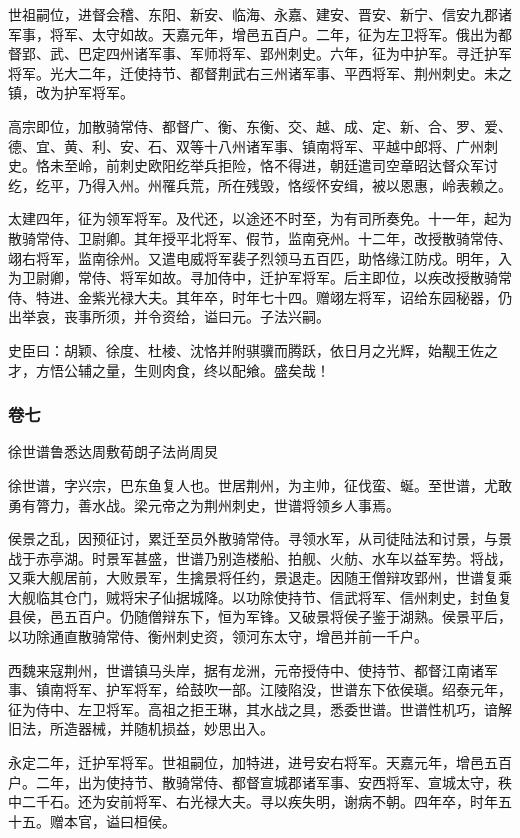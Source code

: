 \documentclass[]{article}
\begin{document}
世祖嗣位，进督会稽、东阳、新安、临海、永嘉、建安、晋安、新宁、信安九郡诸军事，将军、太守如故。天嘉元年，增邑五百户。二年，征为左卫将军。俄出为都督郢、武、巴定四州诸军事、军师将军、郢州刺史。六年，征为中护军。寻迁护军将军。光大二年，迁使持节、都督荆武右三州诸军事、平西将军、荆州刺史。未之镇，改为护军将军。

高宗即位，加散骑常侍、都督广、衡、东衡、交、越、成、定、新、合、罗、爱、德、宜、黄、利、安、石、双等十八州诸军事、镇南将军、平越中郎将、广州刺史。恪未至岭，前刺史欧阳纥举兵拒险，恪不得进，朝廷遣司空章昭达督众军讨纥，纥平，乃得入州。州罹兵荒，所在残毁，恪绥怀安缉，被以恩惠，岭表赖之。

太建四年，征为领军将军。及代还，以途还不时至，为有司所奏免。十一年，起为散骑常侍、卫尉卿。其年授平北将军、假节，监南兗州。十二年，改授散骑常侍、翊右将军，监南徐州。又遣电威将军裴子烈领马五百匹，助恪缘江防戍。明年，入为卫尉卿，常侍、将军如故。寻加侍中，迁护军将军。后主即位，以疾改授散骑常侍、特进、金紫光禄大夫。其年卒，时年七十四。赠翊左将军，诏给东园秘器，仍出举哀，丧事所须，并令资给，谥曰元。子法兴嗣。

史臣曰：胡颖、徐度、杜棱、沈恪并附骐骥而腾跃，依日月之光辉，始觏王佐之才，方悟公辅之量，生则肉食，终以配飨。盛矣哉！

\hypertarget{header-n4450}{%
\subsubsection{卷七}\label{header-n4450}}

徐世谱鲁悉达周敷荀朗子法尚周炅

徐世谱，字兴宗，巴东鱼复人也。世居荆州，为主帅，征伐蛮、蜒。至世谱，尤敢勇有膂力，善水战。梁元帝之为荆州刺史，世谱将领乡人事焉。

侯景之乱，因预征讨，累迁至员外散骑常侍。寻领水军，从司徒陆法和讨景，与景战于赤亭湖。时景军甚盛，世谱乃别造楼船、拍舰、火舫、水车以益军势。将战，又乘大舰居前，大败景军，生擒景将任约，景退走。因随王僧辩攻郢州，世谱复乘大舰临其仓门，贼将宋子仙据城降。以功除使持节、信武将军、信州刺史，封鱼复县侯，邑五百户。仍随僧辩东下，恒为军锋。又破景将侯子鉴于湖熟。侯景平后，以功除通直散骑常侍、衡州刺史资，领河东太守，增邑并前一千户。

西魏来寇荆州，世谱镇马头岸，据有龙洲，元帝授侍中、使持节、都督江南诸军事、镇南将军、护军将军，给鼓吹一部。江陵陷没，世谱东下依侯瑱。绍泰元年，征为侍中、左卫将军。高祖之拒王琳，其水战之具，悉委世谱。世谱性机巧，谙解旧法，所造器械，并随机损益，妙思出入。

永定二年，迁护军将军。世祖嗣位，加特进，进号安右将军。天嘉元年，增邑五百户。二年，出为使持节、散骑常侍、都督宣城郡诸军事、安西将军、宣城太守，秩中二千石。还为安前将军、右光禄大夫。寻以疾失明，谢病不朝。四年卒，时年五十五。赠本官，谥曰桓侯。
\end{document}
